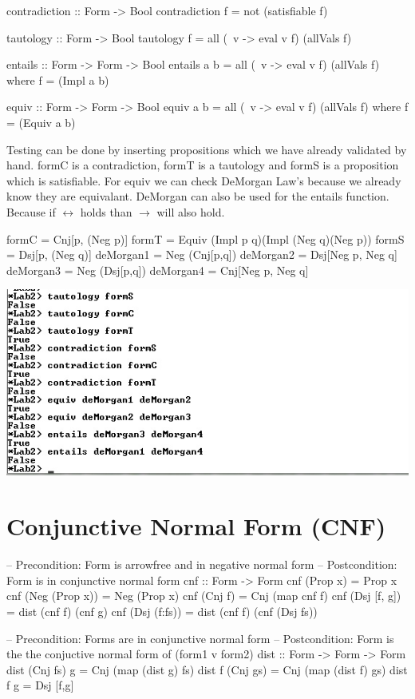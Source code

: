 \documentclass{article}
\begin{document}
\begin{code}
contradiction :: Form -> Bool
contradiction f = not (satisfiable f)

tautology :: Form -> Bool
tautology f = all (\ v -> eval v f) (allVals f)

entails :: Form -> Form -> Bool
entails a b = all (\ v -> eval v f) (allVals f) where f = (Impl a b)

equiv :: Form -> Form -> Bool
equiv a b = all (\ v -> eval v f) (allVals f) where f = (Equiv a b)

\end{code}

Testing can be done by inserting propositions which we have already validated by hand.
formC is a contradiction, formT is a tautology and formS is a proposition which is satisfiable.
For equiv we can check DeMorgan Law's because we already know they are equivalant. DeMorgan can also be used for the entails function. Because if $ \leftrightarrow $ holds than $ \rightarrow $ will also hold.

\begin{code}
formC =  Cnj[p, (Neg p)]
formT = Equiv (Impl p q)(Impl (Neg q)(Neg p))
formS = Dsj[p, (Neg q)]
deMorgan1 = Neg (Cnj[p,q])
deMorgan2 = Dsj[Neg p, Neg q]
deMorgan3 = Neg (Dsj[p,q])
deMorgan4 = Cnj[Neg p, Neg q]
\end{code}

\includegraphics{Knipsel3}

\section*{Conjunctive Normal Form (CNF)}

\begin{code}
-- Precondition: Form is arrowfree and in negative normal form
-- Postcondition: Form is in conjunctive normal form
cnf :: Form -> Form
cnf (Prop x)		= Prop x
cnf (Neg (Prop x))	= Neg (Prop x)
cnf (Cnj f)		= Cnj (map cnf f)
cnf (Dsj [f, g])	= dist (cnf f) (cnf g)
cnf (Dsj (f:fs))	= dist (cnf f) (cnf (Dsj fs))

-- Precondition: Forms are in conjunctive normal form
-- Postcondition: Form is the the conjuctive normal form of (form1 v form2)
dist :: Form -> Form -> Form
dist (Cnj fs) g 	= Cnj (map (dist g) fs)
dist f (Cnj gs)		= Cnj (map (dist f) gs)
dist f g 		= Dsj [f,g]

\end{code}
\end{document}
